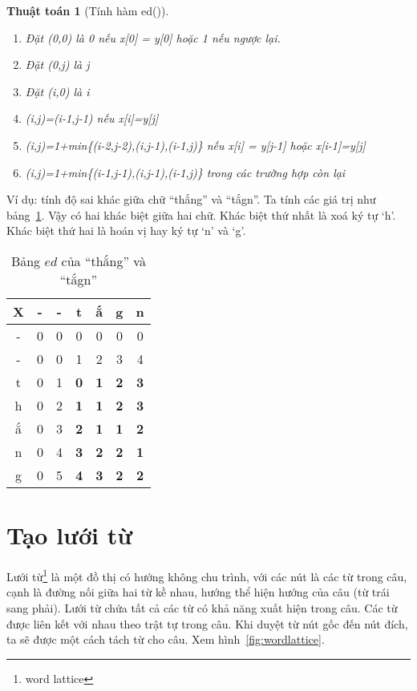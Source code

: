 \documentclass[a4paper,oneside]{book} %
\theoremstyle{break}
\newtheorem{algo}{Thuật toán}
\begin{document}
\begin{algo}[Tính hàm ed()]
  \begin{enumerate}
  \item Đặt (0,0) là 0 nếu x[0] = y[0] hoặc 1 nếu ngược lại.
  \item Đặt (0,j) là j
  \item Đặt (i,0) là i
  \item (i,j)=(i-1,j-1) nếu x[i]=y[j]
  \item (i,j)=1+min\{(i-2,j-2),(i,j-1),(i-1,j)\} nếu x[i] = y[j-1]
    hoặc x[i-1]=y[j]
  \item (i,j)=1+min\{(i-1,j-1),(i,j-1),(i-1,j)\} trong các trường hợp còn lại
  \end{enumerate}
\end{algo}

Ví dụ: tính độ sai khác giữa chữ ``thắng'' và ``tắgn''. Ta tính các
giá trị như bảng~\ref{tab:ed-example}. Vậy có hai khác biệt giữa hai
chữ. Khác biệt thứ nhất là xoá ký tự `h'. Khác biệt thứ hai là hoán vị
hay ký tự `n' và `g'.

\begin{table}[htbp]
  \centering
  \begin{tabular}{|c|c|c|c|c|c|c|}
    \hline
    X&-&-&t&ắ&g&n\\\hline
    -&0&0&0&0&0&0\\\hline
    -&0&0&1&2&3&4\\\hline
    t&0&1&\bf 0&\bf 1&\bf 2&\bf 3\\\hline
    h&0&2&\bf 1&\bf 1&\bf 2&\bf 3\\\hline
    ắ&0&3&\bf 2&\bf 1&\bf 1&\bf 2\\\hline
    n&0&4&\bf 3&\bf 2&\bf 2&\bf 1\\\hline
    g&0&5&\bf 4&\bf 3&\bf 2&\bf 2\\\hline
  \end{tabular}
  \caption{Bảng $ed$ của ``thắng'' và ``tắgn''}
  \label{tab:ed-example}
\end{table}

\section{Tạo lưới từ}
\label{sub:lattice}
Lưới từ\footnote{word lattice} là một đồ thị có hướng không chu trình,
với các nút là các từ trong câu, cạnh là đường nối giữa hai từ kề
nhau, hướng thể hiện hướng của câu (từ trái sang phải). Lưới từ
chứa tất cả 
các từ có khả năng xuất hiện trong câu. Các từ được liên kết với nhau
theo trật tự trong câu. Khi duyệt từ nút gốc đến nút đích, ta sẽ được
một cách tách từ cho câu. Xem hình~\ref{fig:wordlattice}.
\end{document}
